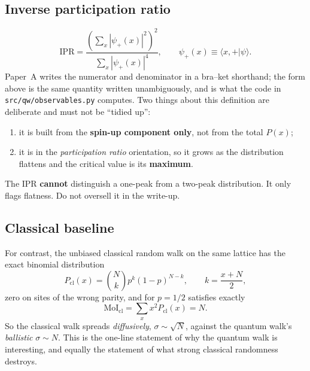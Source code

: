 \documentclass[11pt]{article}
\newcommand{\braket}[2]{\langle #1 \vert #2 \rangle}
\newcommand{\MoI}{\mathrm{MoI}}
\newcommand{\IPR}{\mathrm{IPR}}
\begin{document}
\subsection{Inverse participation ratio}
\begin{equation}
\IPR = \frac{\left(\sum_{x}\left|\psi_{+}(x)\right|^{2}\right)^{2}}
            {\sum_{x}\left|\psi_{+}(x)\right|^{4}},
\qquad \psi_{+}(x) \equiv \braket{x,+}{\psi}.
\label{eq:ipr}
\end{equation}
Paper~A writes the numerator and denominator in a bra--ket shorthand; the
form above is the same quantity written unambiguously, and is what the code
in \texttt{src/qw/observables.py} computes.
Two things about this definition are deliberate and must not be
``tidied up'':
\begin{enumerate}
  \item it is built from the \textbf{spin-up component only}, not from the
        total $P(x)$;
  \item it is in the \emph{participation ratio} orientation, so it grows as
        the distribution flattens and the critical value is its
        \textbf{maximum}.
\end{enumerate}
The IPR \textbf{cannot} distinguish a one-peak from a two-peak distribution.
It only flags flatness. Do not oversell it in the write-up.

\subsection{Classical baseline}
\label{sec:classical}
For contrast, the unbiased classical random walk on the same lattice has the
exact binomial distribution
\begin{equation}
P_{\mathrm{cl}}(x) = \binom{N}{k} p^{k}(1-p)^{N-k},
\qquad k = \frac{x+N}{2},
\label{eq:classical}
\end{equation}
zero on sites of the wrong parity, and for $p=1/2$ satisfies exactly
\begin{equation}
\MoI_{\mathrm{cl}} = \sum_x x^2 P_{\mathrm{cl}}(x) = N .
\label{eq:classical-moi}
\end{equation}
So the classical walk spreads \emph{diffusively}, $\sigma \sim \sqrt{N}$,
against the quantum walk's \emph{ballistic} $\sigma \sim N$. This is the
one-line statement of why the quantum walk is interesting, and equally the
statement of what strong classical randomness destroys.
\end{document}

